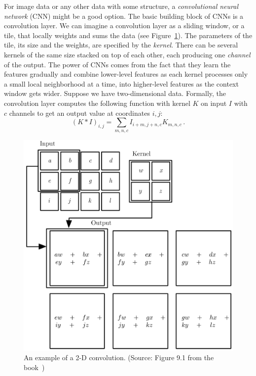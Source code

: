 For image data or any other data with some structure, a \textit{convolutional neural network} (CNN) might be a good option. The basic building block of CNNs is a convolution layer. We can imagine a convolution layer as a sliding window, or a tile, that locally weights and sums the data (see Figure~\ref{fig:conv}). The parameters of the tile, its size and the weights, are specified by the \textit{kernel}. There can be several kernels of the same size stacked on top of each other, each producing one \textit{channel} of the output. The power of CNNs comes from the fact that they learn the features gradually and combine lower-level features as each kernel processes only a small local neighborhood at a time, into higher-level features as the context window gets wider. Suppose we have two-dimensional data. Formally, the convolution layer computes the following function with kernel $K$ on input $I$ with $c$ channels to get an output value at coordinates $i,j$:
\[
 (K \ast I)_{i,j} =\sum_{m,n,c} I_{i+m,j+n,c}K_{m,n,c}\,.
\]

\begin{figure}
    \centering
    \includegraphics[scale=0.25]{img/convolution.png}
    \caption{An example of a 2-D convolution. (Source: Figure 9.1 from the  book~\cite{Goodfellow-et-al-2016})}
    \label{fig:conv}
\end{figure}

